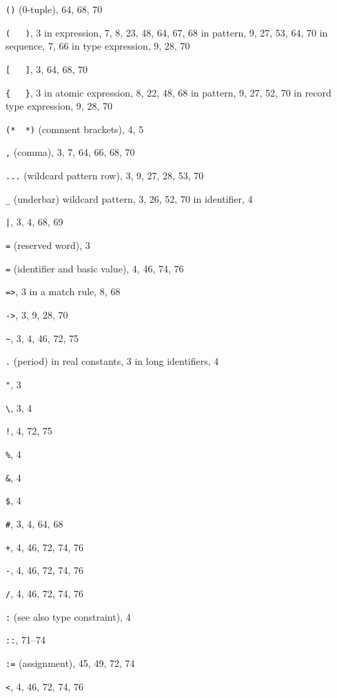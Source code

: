 \label{index-sec}
\begin{theindex}
\item \verb+()+ (0-tuple), 64, 68, 70
\item \verb+(   )+, 3
\subitem in expression, 7, 8, 23, 48, 64, 67, 68
\subitem in pattern, 9, 27, 53, 64, 70
\subitem in sequence, 7, 66
\subitem in type expression, 9, 28, 70
\item \verb+[   ]+, 3, 64, 68, 70
\item \verb+{   }+, 3
\subitem in atomic expression, 8, 22, 48, 68
\subitem in pattern, 9, 27, 52, 70
\subitem in record type expression, 9, 28, 70
\item \verb+(*  *)+ (comment brackets), 4, 5
\item \verb+,+ (comma), 3, 7, 64, 66, 68, 70
\item \verb+...+ (wildcard pattern row), 3, 9, 27, 28, 53, 70
\item \verb+_+ (underbar) 
\subitem wildcard pattern, 3, 26, 52, 70
\subitem in identifier, 4
\item \verb+|+, 3, 4, 68, 69
\item \verb+=+ (reserved word), 3
\item \verb+=+ (identifier and basic value), 4, 46, 74, 76
\item \verb+=>+, 3
\subitem in a match rule, 8, 68
\item \verb+->+, 3, 9, 28, 70
\item \verb+~+, 3, 4, 46, 72, 75
\item \verb+.+ (period) 
\subitem in real constants, 3
\subitem in long identifiers, 4
\item \verb+"+, 3
\item \verb+\+, 3, 4
\item \verb+!+, 4, 72, 75
\item \verb+%+, 4
\item \verb+&+, 4
\item \verb+$+, 4
\item \verb+#+, 3, 4, 64, 68
\item \verb(+(, 4, 46, 72, 74, 76
\item \verb+-+, 4, 46, 72, 74, 76
\item \verb+/+, 4, 46, 72, 74, 76
\item \verb+:+ (see also type constraint), 4
\item \verb+::+, 71--74
\item \verb+:=+ (assignment), 45, 49, 72, 74
\item \verb+<+, 4, 46, 72, 74, 76

\end{theindex}
